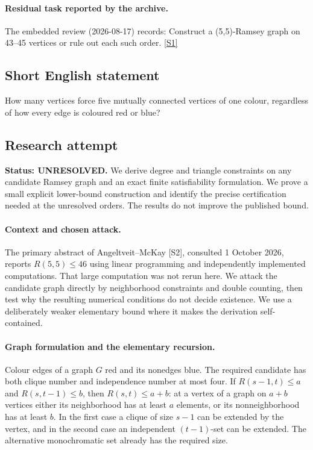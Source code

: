 \documentclass[11pt,a4paper]{article}
\newcommand{\sref}[2]{\hyperlink{source:#1:#2}{[S#2]}}
\begin{document}
\paragraph{Residual task reported by the archive.}

The embedded review (2026-08-17) records: Construct a (5,5)-Ramsey graph on 43--45 vertices or rule out each such order. \sref{29}{1}

\subsection{Short English statement}

How many vertices force five mutually connected vertices of one colour, regardless of how every edge is coloured red or blue?

\subsection{Research attempt}
\textbf{Status: UNRESOLVED.} We derive degree and triangle constraints on any candidate Ramsey graph and an exact finite satisfiability formulation. We prove a small explicit lower-bound construction and identify the precise certification needed at the unresolved orders. The results do not improve the published bound.

\paragraph{Context and chosen attack.}
The primary abstract of Angeltveit--McKay [S2], consulted 1 October 2026, reports $R(5,5)\le46$ using linear programming and independently implemented computations. That large computation was not rerun here. We attack the candidate graph directly by neighborhood constraints and double counting, then test why the resulting numerical conditions do not decide existence. We use a deliberately weaker elementary bound where it makes the derivation self-contained.

\paragraph{Graph formulation and the elementary recursion.}
Colour edges of a graph $G$ red and its nonedges blue. The required candidate has both clique number and independence number at most four. If $R(s-1,t)\le a$ and $R(s,t-1)\le b$, then $R(s,t)\le a+b$: at a vertex of a graph on $a+b$ vertices either its neighborhood has at least $a$ elements, or its nonneighborhood has at least $b$. In the first case a clique of size $s-1$ can be extended by the vertex, and in the second case an independent $(t-1)$-set can be extended. The alternative monochromatic set already has the required size.
\end{document}

